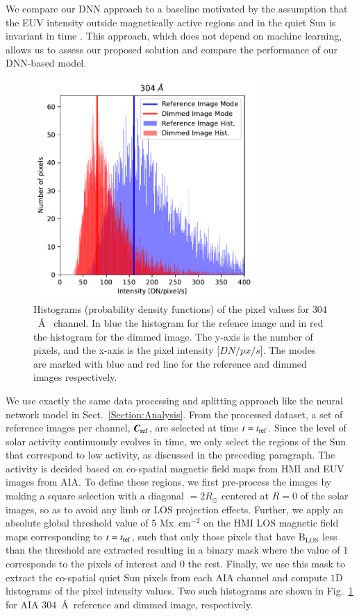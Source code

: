 \documentclass{aa}
\begin{document}
We compare our DNN approach to a baseline motivated by the assumption that the EUV intensity outside magnetically active regions and in the quiet Sun is invariant in time 
\citep[a similar approach is also considered for the in-flight calibration of some UV instruments, e.g.][]{Schule1998}. This approach, which does not depend on  machine learning, allows us to assess our proposed solution and compare the performance of our DNN-based model.

\begin{figure}[h]
    \centering
        \includegraphics[height=3.3in]{hist_demo.pdf}
        \caption{Histograms (probability density functions) of the pixel values for $304$~\AA~  channel. In blue the histogram for the refence image and in red the histogram for the dimmed image. The y-axis is the number of pixels, and the x-axis is the pixel intensity [$DN/px/s$]. The modes are marked with blue and red line for the reference and dimmed images respectively.}
        \label{fig:baseline_histogram}
\end{figure}

We use exactly the same data processing and splitting approach like the neural network model in Sect.~\ref{Section:Analysis}. From the processed dataset, a set of reference images per channel, ${\vec{C}_{\rm ref}}$, are selected at time $t=t_{\rm ref}$. Since the level of solar activity continuously evolves in time, we only select the regions of the Sun that correspond to low activity, as discussed in the preceding paragraph. The activity is decided based on co-spatial magnetic field maps from HMI and EUV images from AIA. To define these regions, we first pre-process the images by making a square selection with a diagonal $= 2R_\odot$ centered at $R=0$ of the solar images, so as to avoid any limb or LOS projection effects. Further, we apply an absolute global threshold value of  $5$ Mx~cm$^{-2}$ on the HMI LOS magnetic field maps corresponding to $t=t_{\rm ref}$, such that only those pixels that have B$_{\mathrm{LOS}}$ less than the threshold are extracted resulting in a binary mask where the value of $1$ corresponds to the pixels of interest and $0$ the rest. Finally, we use this mask to extract the co-spatial quiet Sun pixels from each AIA channel and compute $1$D histograms of the pixel intensity values. Two such histograms are shown in Fig.~\ref{fig:baseline_histogram} for AIA $304$~\AA\ reference and dimmed image, respectively.
\end{document}
